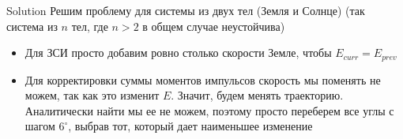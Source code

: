\documentclass{beamer}
\begin{document}
\begin{frame}[fragile]{Solution}
  Решим проблему для системы из двух тел (Земля и Солнце) (так система из $n$ тел, где $n > 2$ в общем случае неустойчива)
  \begin{itemize}
    \item <2-> Для ЗСИ просто добавим ровно столько скорости Земле, чтобы $E_{curr} = E_{prev}$
    \item <3-> Для корректировки суммы моментов импульсов скорость мы поменять не можем, так
    как это изменит $E$. Значит, будем менять траекторию. Аналитически найти мы ее не можем, поэтому
    просто переберем все углы с шагом $6^\circ$, выбрав тот, который дает наименьшее изменение
  \end{itemize}
\end{frame}
\end{document}
